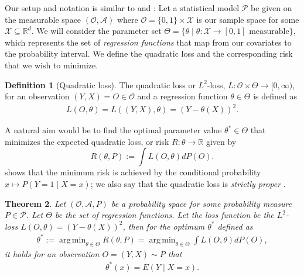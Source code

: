\documentclass[11pt, a4paper]{article}
\newtheorem{theorem}{Theorem}
\theoremstyle{definition}
\newtheorem{definition}[theorem]{Definition}
\theoremstyle{remark}
\DeclareMathOperator*{\argmin}{arg\,min}
\newcommand{\btheta}{\theta}
\begin{document}
Our setup and notation is similar to \citet{vaart06} and \citet{laan03}:
Let a statistical model $ \mathcal{P} $ be given on the measurable space $ (\mathcal{O}, \mathcal{A}) $ where $ \mathcal{O} = \{0,1\} \times \mathcal{X} $ is our sample space for some $ \mathcal{X} \subseteq \mathbb{R}^{d} $. 
We will consider the parameter set $ \Theta = \{\btheta \mid \btheta : \mathcal{X} \to [0,1] \text{ measurable}\} $, which represents the set of \textit{regression functions} that map from our covariates to the probability interval. We define the quadratic loss and the corresponding risk that we wish to minimize.
\begin{definition}[Quadratic loss]
    The quadratic loss or $ L^2 $-loss, $ L : \mathcal{O} \times \Theta \to [0, \infty) $, for an observation $ (Y, X) = O \in \mathcal{O} $ and a regression function $ \btheta \in \Theta $ is defined as 
\begin{align*}
    L(O, \btheta) = L((Y,X), \btheta) = (Y - \btheta(X))^2.
\end{align*}
\end{definition}
A natural aim would be to find the optimal parameter value $\btheta^* \in \Theta$ that minimizes the expected quadratic loss, or risk $R: \btheta \to \mathbb{R}$ given by 
\begin{equation} \label{l2risk}
    R(\btheta, P) := \int L(O, \btheta)  dP(O).
\end{equation}
 shows that the minimum risk is achieved by the conditional probability $ x \mapsto P(Y = 1\mid X = x) $; we also say that the quadratic loss is \textit{strictly proper} \parencite{gneiting2007strictly}. 
\begin{theorem} \label{minrisk}
    Let $ (\mathcal{O} , \mathcal{A}, P) $ be a probability space for some probability measure $ P \in \mathcal{P} $. Let $ \Theta $ be the set of regression functions. Let the loss function be the $ L^2 $-loss $ L(O, \btheta) = (Y - \btheta(X))^2 $, then for the optimum $ \btheta^* $ defined as 
    \begin{align*}
        \btheta^* := \argmin_{\btheta \in \Theta} R(\btheta, P)= \argmin_{\btheta \in \Theta} \int L(O, \btheta)  dP(O),
    \end{align*}
    it holds for an observation $ O = (Y, X) \sim P $ that
    \begin{align*}
        \btheta^{*}(x) = E(Y \mid X = x).
    \end{align*}
\end{theorem}
\end{document}
